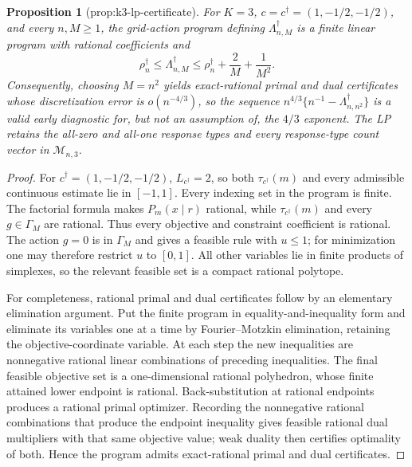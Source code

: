 \documentclass{article}
\newtheorem{proposition}{Proposition}
\begin{document}
\begin{proposition}[prop:k3-lp-certificate]\label{prop:k3-lp-certificate}
For \(K=3\), \(c=c^\dagger=(1,-1/2,-1/2)\), and every \(n,M\ge1\), the grid-action program defining \(\Lambda_{n,M}^\dagger\) is a finite linear program with rational coefficients and \[\rho_n^\dagger\le\Lambda_{n,M}^\dagger\le\rho_n^\dagger+\frac{2}{M}+\frac{1}{M^2}.\] Consequently, choosing \(M=n^2\) yields exact-rational primal and dual certificates whose discretization error is \(o(n^{-4/3})\), so the sequence \(n^{4/3}\{n^{-1}-\Lambda_{n,n^2}^\dagger\}\) is a valid early diagnostic for, but not an assumption of, the \(4/3\) exponent. The LP retains the all-zero and all-one response types and every response-type count vector in \(\mathcal M_{n,3}\).
\end{proposition}
\begin{proof}
For \(c^\dagger=(1,-1/2,-1/2)\), \(L_{c^\dagger}=2\), so both \(\tau_{c^\dagger}(m)\) and every admissible continuous estimate lie in \([-1,1]\).  Every indexing set in the program is finite.  The factorial formula makes \(P_m(x\mid r)\) rational, while \(\tau_{c^\dagger}(m)\) and every \(g\in\Gamma_M\) are rational.  Thus every objective and constraint coefficient is rational.  The action \(g=0\) is in \(\Gamma_M\) and gives a feasible rule with \(u\le1\); for minimization one may therefore restrict \(u\) to \([0,1]\).  All other variables lie in finite products of simplexes, so the relevant feasible set is a compact rational polytope.

For completeness, rational primal and dual certificates follow by an elementary elimination argument.  Put the finite program in equality-and-inequality form and eliminate its variables one at a time by Fourier--Motzkin elimination, retaining the objective-coordinate variable.  At each step the new inequalities are nonnegative rational linear combinations of preceding inequalities.  The final feasible objective set is a one-dimensional rational polyhedron, whose finite attained lower endpoint is rational.  Back-substitution at rational endpoints produces a rational primal optimizer.  Recording the nonnegative rational combinations that produce the endpoint inequality gives feasible rational dual multipliers with that same objective value; weak duality then certifies optimality of both.  Hence the program admits exact-rational primal and dual certificates.


\end{proof}
\end{document}
